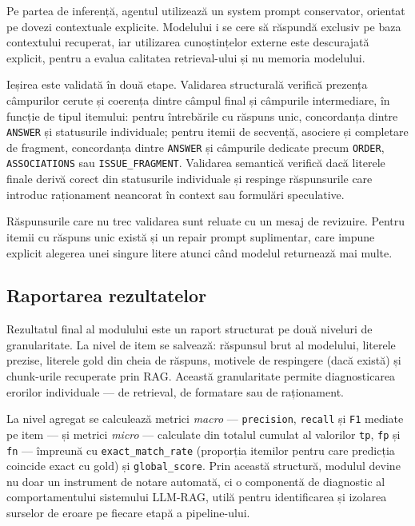\documentclass[12pt, a4paper, oneside, romanian]{teza-upb}
\begin{document}
Pe partea de inferență, agentul utilizează un system prompt conservator, orientat pe dovezi contextuale explicite. Modelului i se cere să răspundă exclusiv pe baza contextului recuperat, iar utilizarea cunoștințelor externe este descurajată explicit, pentru a evalua calitatea retrieval-ului și nu memoria modelului.

Ieșirea este validată în două etape. Validarea structurală verifică prezența câmpurilor cerute și coerența dintre câmpul final și câmpurile intermediare, în funcție de tipul itemului: pentru întrebările cu răspuns unic, concordanța dintre \texttt{ANSWER} și statusurile individuale; pentru itemii de secvență, asociere și completare de fragment, concordanța dintre \texttt{ANSWER} și câmpurile dedicate precum \texttt{ORDER}, \texttt{ASSOCIATIONS} sau \texttt{ISSUE\_FRAGMENT}. Validarea semantică verifică dacă literele finale derivă corect din statusurile individuale și respinge răspunsurile care introduc raționament neancorat în context sau formulări speculative.

Răspunsurile care nu trec validarea sunt reluate cu un mesaj de revizuire. Pentru itemii cu răspuns unic există și un repair prompt suplimentar, care impune explicit alegerea unei singure litere atunci când modelul returnează mai multe.

\subsection{Raportarea rezultatelor}

Rezultatul final al modulului este un raport structurat pe două niveluri de granularitate. La nivel de item se salvează: răspunsul brut al modelului, literele prezise, literele gold din cheia de răspuns, motivele de respingere (dacă există) și chunk-urile recuperate prin RAG. Această granularitate permite diagnosticarea erorilor individuale --- de retrieval, de formatare sau de raționament.

La nivel agregat se calculează metrici \textit{macro} --- \texttt{precision}, \texttt{recall} și \texttt{F1} mediate pe item --- și metrici \textit{micro} --- calculate din totalul cumulat al valorilor \texttt{tp}, \texttt{fp} și \texttt{fn} --- împreună cu \texttt{exact\_match\_rate} (proporția itemilor pentru care predicția coincide exact cu gold) și \texttt{global\_score}. Prin această structură, modulul devine nu doar un instrument de notare automată, ci o componentă de diagnostic al comportamentului sistemului LLM-RAG, utilă pentru identificarea și izolarea surselor de eroare pe fiecare etapă a pipeline-ului.
\end{document}
